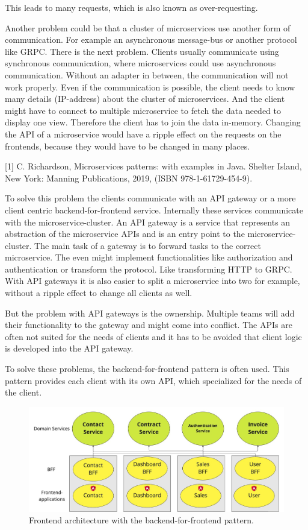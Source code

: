 This leads to many requests, which is also known as over-requesting.

Another problem could be that a cluster of microservices use another form of communication. For example an asynchronous message-bus or another protocol like GRPC. There is the next problem. Clients usually communicate using synchronous communication, where microservices could use asynchronous communication. Without an adapter in between, the communication will not work properly. Even if the communication is possible, the client needs to know many details (IP-address) about the cluster of microservices. And the client might have to connect to multiple microservice to fetch the data needed to display one view. Therefore the client has to join the data in-memory. Changing the API of a microservice would have a ripple effect on the requests on the frontends, because they would have to be changed in many places.

[1] C. Richardson, Microservices patterns: with examples in Java. Shelter Island, New York: Manning Publications, 2019, (ISBN 978-1-61729-454-9).

To solve this problem the clients communicate with an API gateway or a more client centric backend-for-frontend service. Internally these services communicate with the microservice-cluster. An API gateway is a service that represents an abstraction of the microservice APIs and is an entry point to the microservice-cluster. The main task of a gateway is to forward tasks to the correct microservice. The even might implement functionalities like authorization and authentication or transform the protocol. Like transforming HTTP to GRPC. With API gateways it is also easier to split a microservice into two for example, without a ripple effect to change all clients as well.

But the problem with API gateways is the ownership. Multiple teams will add their functionality to the gateway and might come into conflict. The APIs are often not suited for the needs of clients and it has to be avoided that client logic is developed into the API gateway.

\fi

To solve these problems, the backend-for-frontend pattern is often used. This pattern provides each client with its own API, which specialized for the needs of the client. \cite{book:2018:richardson:microservices-patterns}

\ifshowImages
\begin{figure}[H]
\centering
\includegraphics[width=0.8\linewidth]{images/ui-bff-architecture.jpeg}
\caption{Frontend architecture with the backend-for-frontend pattern.}\label{figure:state-of-the-art:ui-bff-architecture}
\end{figure}
\fi


